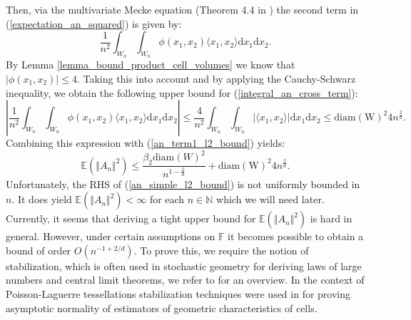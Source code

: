 \documentclass{article}
\newcommand{\NN}{\mathbb{N}}
\newcommand{\EE}{\mathbb{E}}
\theoremstyle{plain}
\theoremstyle{remark}
\theoremstyle{definition}
\begin{document}
Then, via the multivariate Mecke equation (Theorem 4.4 in \cite{Last2018}) the second term in (\ref{expectation_an_squared}) is given by:
\begin{equation}
    \frac{1}{n^2}\int_{W_n}\int_{W_n}\phi(x_1,x_2)\langle x_1, x_2\rangle \mathrm{d}x_1\mathrm{d}x_2.\label{integral_an_cross_term}
\end{equation}
By Lemma \ref{lemma_bound_product_cell_volumes} we know that $|\phi(x_1,x_2)| \leq 4$. Taking this into account and by applying the Cauchy-Schwarz inequality, we obtain the following upper bound for (\ref{integral_an_cross_term}):
\[\left|\frac{1}{n^2}\int_{W_n}\int_{W_n}\phi(x_1,x_2)\langle x_1, x_2\rangle \mathrm{d}x_1\mathrm{d}x_2\right| \leq \frac{4}{n^2}\int_{W_n}\int_{W_n}\left|\langle x_1, x_2\rangle\right| \mathrm{d}x_1\mathrm{d}x_2 \leq  \mathrm{diam(W)^2} 4n^\frac{2}{d}.\]
Combining this expression with (\ref{an_term1_l2_bound}) yields:
\begin{equation}
    \EE\left(\Vert A_n\Vert^2 \right) \leq \frac{\beta_2 \mathrm{diam}(W)^2}{n^{1-\frac{2}{d}}} + \mathrm{diam(W)^2} 4n^\frac{2}{d}. \label{an_simple_l2_bound}
\end{equation}
Unfortunately, the RHS of (\ref{an_simple_l2_bound}) is not uniformly bounded in $n$. It does yield $\EE(\Vert A_n\Vert^2) < \infty$ for each $n \in \NN$ which we will need later. Currently, it seems that deriving a tight upper bound for $\EE\left(\Vert A_n\Vert^2 \right)$ is hard in general. However, under certain assumptions on $\mathbb{F}$ it becomes possible to obtain a bound of order $O(n^{-1+2/d})$. To prove this, we require the notion of stabilization, which is often used in stochastic geometry for deriving laws of large numbers and central limit theorems, we refer to \cite{Schreiber2010} for an overview. In the context of Poisson-Laguerre tessellations stabilization techniques were used in \cite{Flimmel2020} for proving asymptotic normality of estimators of geometric characteristics of cells. 
\end{document}
